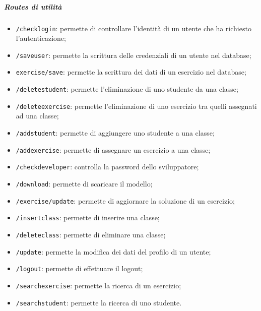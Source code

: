 \subparagraph*{Routes di utilità}
\begin{itemize}
	\item \texttt{/checklogin}: permette di controllare l'identità di un utente che ha richiesto l'autenticazione;
	\item \texttt{/saveuser}: permette la scrittura delle credenziali di un utente nel database;
	\item \texttt{exercise/save}: permette la scrittura dei dati di un esercizio nel database;
	\item \texttt{/deletestudent}: permette l'eliminazione di uno studente da una classe;
	\item \texttt{/deleteexercise}: permette l'eliminazione di uno esercizio tra quelli assegnati ad una classe;
	\item \texttt{/addstudent}: permette di aggiungere uno studente a una classe;
	\item \texttt{/addexercise}: permette di assegnare un esercizio a una classe;
	\item \texttt{/checkdeveloper}: controlla la password dello sviluppatore;
	\item \texttt{/download}: permette di scaricare il modello;
	\item \texttt{/exercise/update}: permette di aggiornare la soluzione di un esercizio;
	\item \texttt{/insertclass}: permette di inserire una classe;
	\item \texttt{/deleteclass}: permette di eliminare una classe;
	\item \texttt{/update}: permette la modifica dei dati del profilo di un utente;
	\item \texttt{/logout}: permette di effettuare il logout;
	\item \texttt{/searchexercise}: permette la ricerca di un esercizio;
	\item \texttt{/searchstudent}: permette la ricerca di uno studente.
	
	
\end{itemize}